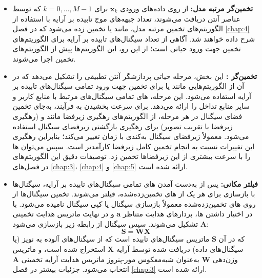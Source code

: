 \begin{itemize}
	\item \textbf{تخمین‌گر مرتبه مدل:} از روی داده‌های ورودی $\bm{x}_k$ برای $k = 0, \dots, M-1$ که توسط عناصر آنتن دریافت می‌شوند، تعداد جبهه‌های موج تابیده بر آرایه با استفاده از الگوریتم‌های تخمین مرتبه مدل، مانند  یا  تخمین زده می‌شود که در فصل \ref{chap:4} شرح داده خواهند شد. آگاهی از تعداد سیگنال‌های تابیده بر آرایه برای الگوریتم‌های تخمین جهت ورود حیاتی است؛ از این رو، این الگوریتم‌ها پیش از الگوریتم‌های تخمین  اجرا می‌شوند.
	
	\item \textbf{تخمین‌گر :} این بخش، مرحله حیاتی پردازشگر آنتن تطبیقی را تشکیل می‌دهد که در آن از الگوریتم‌هایی مانند  یا  برای تخمین جهت ورود تمامی سیگنال‌های تابیده بر آرایه استفاده می‌شود. این مرحله، های تمامی سیگنال‌های مرتبط با منابع کاربر و سایر منابع تداخل را ارائه می‌دهد. برای سرعت بخشیدن به فرآیند، به‌جای تخمین فضای سیگنال در هر مرحله، از الگوریتم‌های رهگیری زیرفضا مانند  و  (رهگیری زیرفضا با تقریب تصویر) برای رهگیری بازگشتی زیرفضای سیگنال استفاده می‌شود. معمولاً زیرفضای سیگنال به‌کندی با زمان تغییر می‌کند؛ بنابراین رهگیری این تغییرات نسبت به انجام تخمین کامل زیرفضا کارآمدتر است. سپس می‌توان ها را با سرعت بیشتری از این زیرفضاها تخمین زد. توصیفات دقیق این الگوریتم‌های  در فصل‌های \ref{chap:3}، \ref{chap:4} و \ref{chap:5} ارائه شده است.
	
	\item \textbf{فیلتر مکانی:} پس از به‌دست آمدن های تمامی سیگنال‌های تابیده بر آرایه، سیگنال‌ها با بازسازی برای هر یک از های تخمین‌زده‌شده، فیلتر می‌شوند. تخمین سیگنال‌ها از روی های تخمین‌زده‌شده معمولاً بازسازی سیگنال یا کپی سیگنال نامیده می‌شود. با در اختیار داشتن ها، بردارهای هدایت متناظر $\bm{a}$ و در نهایت ماتریس هدایت تخمینی $\bm{A}$ تشکیل می‌شوند. سپس سیگنال از رابطه زیر بازسازی می‌شود:
	\begin{equation}
		\bm{S} = \bm{W}\bm{X}
		\label{eq:1-1}
	\end{equation}
	که در آن $\bm{S}$ ماتریس سیگنال‌های تابیده است که از سیگنال‌های آلوده به نویز (یا سیگنال‌های داده) دریافت شده توسط آرایه $\bm{X}$ استخراج شده است، و ماتریس وزن‌دهی $\bm{W}$ به‌عنوان شبه‌معکوس مور-پنروز ماتریس هدایت آرایه تخمینی $\bm{A}$ انتخاب می‌شود. جزئیات بیشتر در فصل \ref{chap:3} ارائه شده است.
	

\end{itemize}
